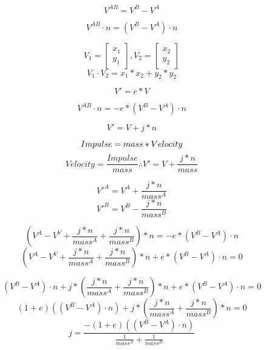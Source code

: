 \documentclass[letterpaper]{article}
\begin{document}
	\begin{equation}
		V^{AB} = V^B - V^A
	\end{equation}

	\begin{equation}
		V^{AB} \cdot n = (V^B - V^A) \cdot n
	\end{equation}

	\begin{equation}
		V_1 = \begin{bmatrix}x_1 \\y_1\end{bmatrix}, V_2 = \begin{bmatrix}x_2 \\y_2\end{bmatrix}
	\end{equation}
	\[V_1 \cdot V_2 = x_1 * x_2 + y_2 * y_2\]

	\begin{equation}
		V' = e * V
	\end{equation}

	\begin{equation}
		V^{AB} \cdot n = -e * (V^B - V^A) \cdot n
	\end{equation}

	\begin{equation}
		V' = V + j * n
	\end{equation}

	\begin{equation}
		Impulse = mass * Velocity \\
	\end{equation}
	\[Velocity = \frac{Impulse}{mass} \therefore V' = V + \frac{j * n}{mass}\]

	\begin{equation}
		V'^A = V^A + \frac{j * n}{mass^A}
	\end{equation}
	\[V'^B = V^B - \frac{j * n}{mass^B}\]

	\begin{equation}
		(V^A - V^V + \frac{j * n}{mass^A} + \frac{j * n}{mass^B}) * n = -e * (V^B - V^A) \cdot n
	\end{equation}
	\[(V^A - V^V + \frac{j * n}{mass^A} + \frac{j * n}{mass^B}) * n + e * (V^B - V^A) \cdot n = 0\]

	\begin{equation}
		(V^B - V^A) \cdot n + j * (\frac{j * n}{mass^A} + \frac{j * n}{mass^B}) * n + e * (V^B - V^A) \cdot n = 0
	\end{equation}
	\[(1 + e)((V^B - V^A) \cdot n) + j * (\frac{j * n}{mass^A} + \frac{j * n}{mass^B}) * n = 0\]
	\[j = \frac{-(1 + e)((V^B - V^A) \cdot n)}{\frac{1}{mass^A} + \frac{1}{mass^B}}\]
\end{document}
